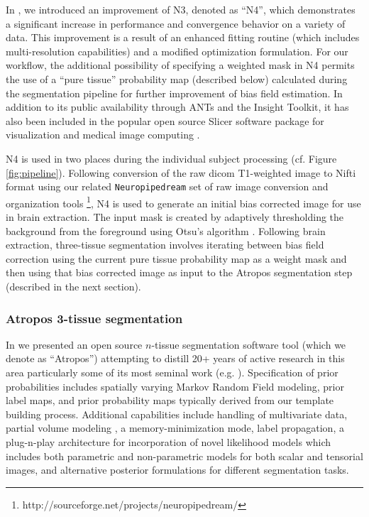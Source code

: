 In \cite{tustison2010}, we introduced an improvement of N3, denoted as
``N4'', which demonstrates a significant increase in performance and convergence behavior
on a variety of data.  This improvement is a result of an enhanced 
fitting routine (which includes multi-resolution capabilities) and a modified optimization 
formulation.  For our workflow, the additional possibility of specifying
a weighted mask in N4 permits the use of a ``pure tissue'' probability map 
(described below)
calculated during the segmentation pipeline for further improvement of 
bias field estimation.  In addition to its public availability 
through ANTs and the Insight Toolkit, it has also been included in
the popular open source Slicer software package for visualization and medical
image computing \citep{fedorov2011}.

N4 is used in two places during the individual subject processing (cf. Figure
\ref{fig:pipeline}).  Following conversion of the raw dicom T1-weighted image
to Nifti format using our related \verb#Neuropipedream# set of raw image conversion
and organization tools%
\footnote{
http://sourceforge.net/projects/neuropipedream/
}, N4 is used to generate an initial bias corrected image for use in
brain extraction.  The input mask is created by adaptively thresholding 
the background from the foreground using Otsu's algorithm \citep{otsu1979}.
Following brain extraction, three-tissue segmentation involves iterating
between bias field correction using the current pure tissue 
probability map as a weight mask and then using that bias corrected image
as input to the Atropos segmentation step (described in the next section). 

\subsubsection{Atropos 3-tissue segmentation}

In \cite{avants2011a} we presented an open source $n$-tissue segmentation software tool
(which we denote as ``Atropos'') attempting to distill 20+ years of active research in this area
particularly some of its most seminal work (e.g. \cite{zhang2001,ashburner2005}). 
Specification of prior probabilities includes spatially varying Markov Random Field modeling, 
prior label maps, and prior probability maps typically derived from our template building 
process.  Additional
capabilities include handling of multivariate data, 
partial volume modeling \citep{shattuck2001}, a memory-minimization mode,
label propagation, a plug-n-play architecture for incorporation of novel likelihood models
which includes both parametric and non-parametric models for both scalar and tensorial
images, and alternative posterior formulations for different segmentation tasks.

